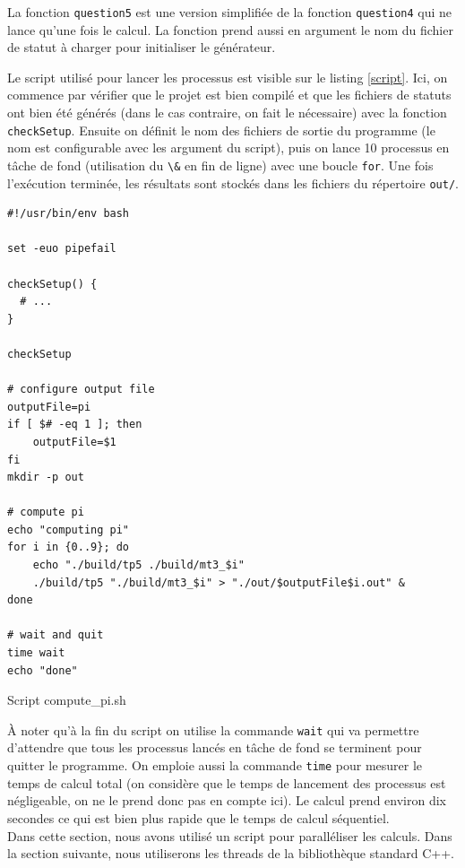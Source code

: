 \documentclass[a4paper]{article}
\begin{document}
La fonction \lstinline{question5} est une version simplifiée de la fonction
\lstinline{question4} qui ne lance qu'une fois le calcul. La fonction prend
aussi en argument le nom du fichier de statut à charger pour initialiser le
générateur.

Le script utilisé pour lancer les processus est visible sur le listing
\ref{script}. Ici, on commence par vérifier que le projet est bien compilé et
que les fichiers de statuts ont bien été générés (dans le cas contraire, on fait
le nécessaire) avec la fonction \lstinline{checkSetup}. Ensuite on définit le
nom des fichiers de sortie du programme (le nom est configurable avec les
argument du script), puis on lance 10 processus en tâche de fond (utilisation du
\lstinline{\&} en fin de ligne) avec une boucle \lstinline{for}. Une fois
l'exécution terminée, les résultats sont stockés dans les fichiers du répertoire
\lstinline{out/}.

\begin{listing}[ht!]
\begin{verbatim}
#!/usr/bin/env bash

set -euo pipefail

checkSetup() {
  # ...
}

checkSetup

# configure output file
outputFile=pi
if [ $# -eq 1 ]; then
    outputFile=$1
fi
mkdir -p out

# compute pi
echo "computing pi"
for i in {0..9}; do
    echo "./build/tp5 ./build/mt3_$i"
    ./build/tp5 "./build/mt3_$i" > "./out/$outputFile$i.out" &
done

# wait and quit
time wait
echo "done"
\end{verbatim}
\caption{Script compute\_pi.sh}
\label{script}
\end{listing}
\clearpage

À noter qu'à la fin du script on utilise la commande \lstinline{wait} qui va
permettre d'attendre que tous les processus lancés en tâche de fond se terminent
pour quitter le programme. On emploie aussi la commande \lstinline{time} pour
mesurer le temps de calcul total (on considère que le temps de lancement des
processus est négligeable, on ne le prend donc pas en compte ici). Le calcul
prend environ dix secondes ce qui est bien plus rapide que le temps de calcul
séquentiel.\\

Dans cette section, nous avons utilisé un script pour paralléliser les calculs.
Dans la section suivante, nous utiliserons les threads de la bibliothèque
standard C++.
\end{document}
